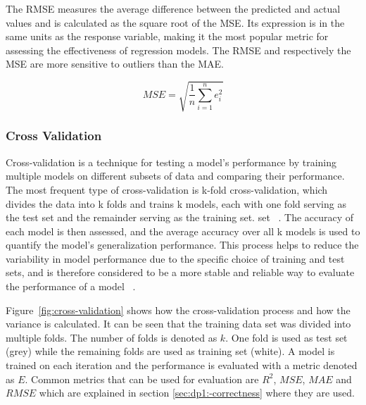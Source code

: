 The RMSE measures the average difference between the predicted and actual values and is calculated as the square root
of the MSE.
Its expression is in the same units as the response variable, making it the most popular metric for assessing the
effectiveness of regression models.
The RMSE and respectively the MSE are more sensitive to outliers than the MAE.

\begin{tcolorbox}[arc=0pt,boxrule=0.5pt]
    \begin{equation}
        \label{eq:rmse}
        MSE = \sqrt{\frac{1}{n} \sum_{i=1}^{n} e_i^2}
    \end{equation}
\end{tcolorbox}

\subsubsection{Cross Validation}\label{subsubsec:cross-validation}
Cross-validation is a technique for testing a model's performance by training multiple models on different subsets of
data and comparing their performance.
The most frequent type of cross-validation is k-fold cross-validation, which divides the data into k folds and trains
k models, each with one fold serving as the test set and the remainder serving as the training set.
set
~\cite[p. 252--260]{muller2016introduction}.
The accuracy of each model is then assessed, and the average accuracy over all k models is used to quantify the model's
generalization performance.
This process helps to reduce the variability in model performance due to the specific choice of training and test
sets, and is therefore considered to be a more stable and reliable way to evaluate the performance of a
model
~\cite[p. 252--260]{muller2016introduction}.

Figure~\ref{fig:cross-validation} shows how the cross-validation process and how the variance
is calculated.
It can be seen that the training data set was divided into multiple folds.
The number of folds is denoted as $k$.
One fold is used as test set (grey) while the remaining folds are used as training set (white).
A model is trained on each iteration and the performance is evaluated with a metric denoted as $E$.
Common metrics that can be used for evaluation are $R^2$, $MSE$, $MAE$ and $RMSE$ which are explained in section
\ref{sec:dp1:-correctness} where they are used.

